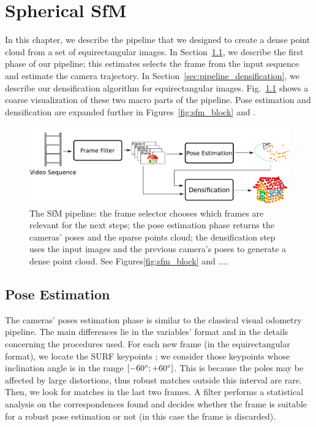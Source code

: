 \chapter{Spherical SfM}
In this chapter, we describe the pipeline that we designed to create a dense 
point cloud from a set of equirectangular images.
In Section~\ref{sec:pipeline_pose_estimation}, we describe the first phase of our
pipeline; this estimates selects the frame from the input sequence and estimate
the camera trajectory. In Section~\ref{sec:pipeline_densification}, we describe 
our densification algorithm for equirectangular images.
Fig.~\ref{fig:pipeline_overview} shows a coarse visualization of these two macro parts of the 
pipeline. Pose estimation and densification are 
expanded further in Figures~\ref{fig:sfm_block} and .

\begin{figure}
    \centering
    \includegraphics[width=0.8\linewidth]{img/pipeline_overview.pdf}
    \caption{The SfM pipeline: the frame selector chooses which frames are 
    relevant for the next steps; the pose estimation phase returns the cameras' 
    poses and the sparse points cloud; the densification step uses 
    the input images and the previous camera's poses to generate a dense
    point cloud. See Figures\ref{fig:sfm_block} and ....}
	\label{fig:pipeline_overview}
\end{figure}

\section{Pose Estimation}
\label{sec:pipeline_pose_estimation}
The cameras' poses estimation phase is similar to the classical visual 
odometry pipeline. The main differences lie in the variables' format and in 
the details concerning the procedures used.
For each new frame (in the equirectangular format), we locate the
SURF keypoints \cite{bay2006surf}; we consider those keypoints whose inclination angle is in the range $[-60\degree; +60\degree]$. This is because the poles may be affected by large 
distortions, thus robust matches outside this interval are rare.
Then, we look for matches in the last two frames. A filter performs a 
statistical analysis on the correspondences found and decides whether the frame 
is suitable for a robust pose estimation or not (in this case the frame is 
discarded).

